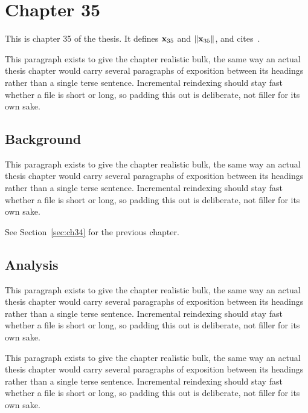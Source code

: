 \section{Chapter 35}
\label{sec:ch35}

This is chapter 35 of the thesis. It defines $\mathbf{x}_{35}$ and $\lVert \mathbf{x}_{35} \rVert$, and cites~\cite{ref1}.

This paragraph exists to give the chapter realistic bulk, the same way an actual thesis chapter would carry several paragraphs of exposition between its headings rather than a single terse sentence. Incremental reindexing should stay fast whether a file is short or long, so padding this out is deliberate, not filler for its own sake.

\subsection{Background}
\label{sec:ch35:background}

This paragraph exists to give the chapter realistic bulk, the same way an actual thesis chapter would carry several paragraphs of exposition between its headings rather than a single terse sentence. Incremental reindexing should stay fast whether a file is short or long, so padding this out is deliberate, not filler for its own sake.

See Section~\ref{sec:ch34} for the previous chapter.

\subsection{Analysis}
\label{sec:ch35:analysis}

This paragraph exists to give the chapter realistic bulk, the same way an actual thesis chapter would carry several paragraphs of exposition between its headings rather than a single terse sentence. Incremental reindexing should stay fast whether a file is short or long, so padding this out is deliberate, not filler for its own sake.

This paragraph exists to give the chapter realistic bulk, the same way an actual thesis chapter would carry several paragraphs of exposition between its headings rather than a single terse sentence. Incremental reindexing should stay fast whether a file is short or long, so padding this out is deliberate, not filler for its own sake.
